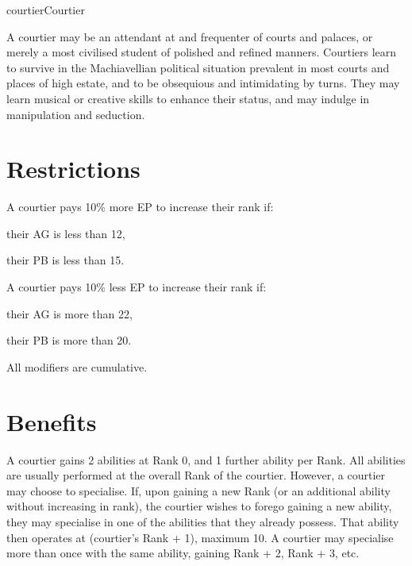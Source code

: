 \begin{Skill}[2.1]{courtier}{Courtier}

A courtier may be an attendant at and frequenter of courts and
palaces, or merely a most civilised student of polished and refined
manners. Courtiers learn to survive in the Machiavellian political
situation prevalent in most courts and places of high estate, and to
be obsequious and intimidating by turns. They may learn musical or
creative skills to enhance their status, and may indulge in
manipulation and seduction.

\section{Restrictions}

A courtier pays 10\% more EP to increase their rank if:

\begin{Itemize}
  
\item their AG is less than 12,  

\item their PB is less than 15. 

\end{Itemize}

A courtier pays 10\% less EP to increase their rank if:

\begin{Itemize}

\item their AG is more than 22,  

\item their PB is more than 20.

\end{Itemize}

All modifiers are cumulative.

\section{Benefits}

A courtier gains 2 abilities at Rank 0, and 1 further ability per
Rank. All abilities are usually performed at the overall Rank of the
courtier.  However, a courtier may choose to specialise. If, upon
gaining a new Rank (or an additional ability without increasing in
rank), the courtier wishes to forego gaining a new ability, they may
specialise in one of the abilities that they already possess.  That
ability then operates at (courtier’s Rank + 1), maximum 10. A courtier
may specialise more than once with the same ability, gaining Rank + 2,
Rank + 3, etc.


\end{Skill}
